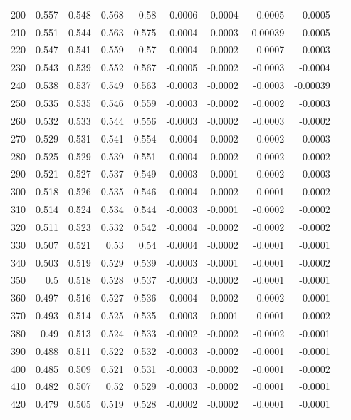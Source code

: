 \documentclass[11pt]{article}
\begin{document}
\begin{table}[!htp]
\begin{tabular}{l|r|r|r|r|r|r|r|r|r}
    200 &0.557 &0.548 &0.568 &0.58 &-0.0006 &-0.0004 &-0.0005 &-0.0005 \\
    210 &0.551 &0.544 &0.563 &0.575 &-0.0004 &-0.0003 &-0.00039 &-0.0005 \\
    220 &0.547 &0.541 &0.559 &0.57 &-0.0004 &-0.0002 &-0.0007 &-0.0003 \\
    230 &0.543 &0.539 &0.552 &0.567 &-0.0005 &-0.0002 &-0.0003 &-0.0004 \\
    240 &0.538 &0.537 &0.549 &0.563 &-0.0003 &-0.0002 &-0.0003 &-0.00039 \\
    250 &0.535 &0.535 &0.546 &0.559 &-0.0003 &-0.0002 &-0.0002 &-0.0003 \\
    260 &0.532 &0.533 &0.544 &0.556 &-0.0003 &-0.0002 &-0.0003 &-0.0002 \\
    270 &0.529 &0.531 &0.541 &0.554 &-0.0004 &-0.0002 &-0.0002 &-0.0003 \\
    280 &0.525 &0.529 &0.539 &0.551 &-0.0004 &-0.0002 &-0.0002 &-0.0002 \\
    290 &0.521 &0.527 &0.537 &0.549 &-0.0003 &-0.0001 &-0.0002 &-0.0003 \\
    300 &0.518 &0.526 &0.535 &0.546 &-0.0004 &-0.0002 &-0.0001 &-0.0002 \\
    310 &0.514 &0.524 &0.534 &0.544 &-0.0003 &-0.0001 &-0.0002 &-0.0002 \\
    320 &0.511 &0.523 &0.532 &0.542 &-0.0004 &-0.0002 &-0.0002 &-0.0002 \\
    330 &0.507 &0.521 &0.53 &0.54 &-0.0004 &-0.0002 &-0.0001 &-0.0001 \\
    340 &0.503 &0.519 &0.529 &0.539 &-0.0003 &-0.0001 &-0.0001 &-0.0002 \\
    350 &0.5 &0.518 &0.528 &0.537 &-0.0003 &-0.0002 &-0.0001 &-0.0001 \\
    360 &0.497 &0.516 &0.527 &0.536 &-0.0004 &-0.0002 &-0.0002 &-0.0001 \\
    370 &0.493 &0.514 &0.525 &0.535 &-0.0003 &-0.0001 &-0.0001 &-0.0002 \\
    380 &0.49 &0.513 &0.524 &0.533 &-0.0002 &-0.0002 &-0.0002 &-0.0001 \\
    390 &0.488 &0.511 &0.522 &0.532 &-0.0003 &-0.0002 &-0.0001 &-0.0001 \\
    400 &0.485 &0.509 &0.521 &0.531 &-0.0003 &-0.0002 &-0.0001 &-0.0002 \\
    410 &0.482 &0.507 &0.52 &0.529 &-0.0003 &-0.0002 &-0.0001 &-0.0001 \\
    420 &0.479 &0.505 &0.519 &0.528 &-0.0002 &-0.0002 &-0.0001 &-0.0001 \\

\end{tabular}
\end{table}
\end{document}
